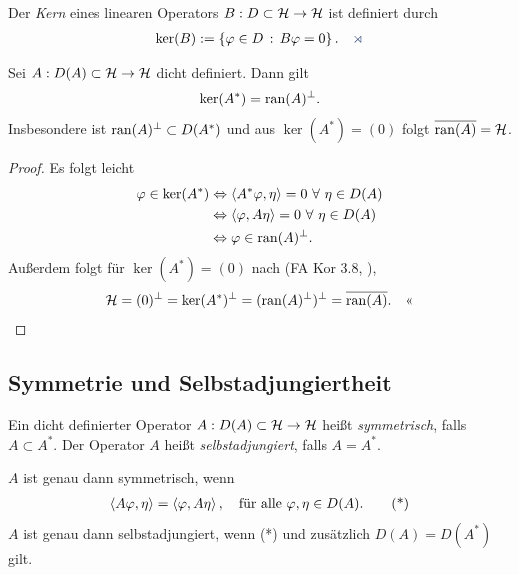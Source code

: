 \begin{defn*}
Der \emph{Kern} eines linearen Operators $B : D
\subset \mathcal{H} \to \mathcal{H}$ ist definiert durch
\begin{align*}
\ker(B) := \setdef{\ph \in D}{B \ph = 0}.\fishhere
\end{align*}
\end{defn*}

\begin{prop}
\label{prop:4.2}
Sei $A:D(A)\subset \mathcal{H}\to \mathcal{H}$ dicht definiert. Dann gilt
\begin{align*}
\ker(A^*) = \operatorname{ran}(A)^\bot.
\end{align*}
Insbesondere ist $\operatorname{ran}(A)^\bot\subset D(A^*)$ und aus $\ker(A^*)=(0)$ folgt
$\overline{\operatorname{ran}(A)} = \mathcal{H}$.\fishhere
\end{prop}
\begin{proof}
Es folgt leicht
\begin{align*}
\ph\in \ker(A^*) &\Leftrightarrow
\lin{A^*\ph,\eta} = 0\forall \eta\in D(A)\\
&\Leftrightarrow
\lin{\ph,A\eta} = 0\forall \eta\in D(A)\\
&\Leftrightarrow
\ph\in\ran(A)^\bot.
\end{align*}
Außerdem folgt für $\ker(A^*)=(0)$ nach (FA Kor 3.8, \cite{Fun07}),
\begin{align*}
\mathcal{H} = (0)^\bot = \ker(A^*)^\bot
= (\operatorname{ran}(A)^\bot)^\bot = \overline{\operatorname{ran}(A)}.\quad\text{<<} 
\end{align*}
\end{proof}

\subsection{Symmetrie und Selbstadjungiertheit}

\begin{defn*}
Ein dicht definierter Operator $A:D(A)\subset \mathcal{H}\to\mathcal{H}$ heißt
\emph{symmetrisch}, falls $A\subset A^*$. Der
Operator $A$ heißt \emph{selbstadjungiert},
falls $A=A^*$.

$A$ ist genau dann symmetrisch, wenn
\begin{align*}
\left\langle A\varphi,\eta\right\rangle = \left\langle\varphi,A\eta\right\rangle,\quad \text{für alle }\varphi,\eta \in
D(A).\tag{*}
\end{align*}
$A$ ist genau dann selbstadjungiert, wenn (*) und zusätzlich $D(A)=D(A^*)$
gilt.\fishhere
\end{defn*}

